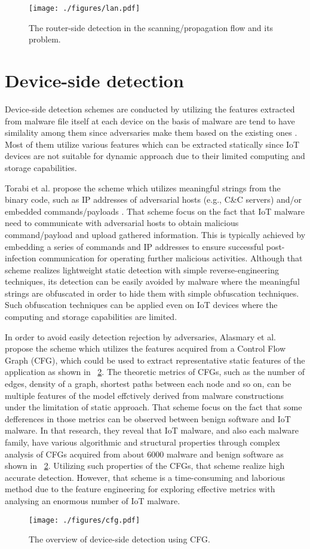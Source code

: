 \begin{figure}[h]
 \centering
 \texttt{[image: ./figures/lan.pdf]}
 \caption{The router-side detection in the scanning/propagation flow and its problem.} 
 \label{fig:lan}
\end{figure}

\section{Device-side detection} 
Device-side detection schemes are conducted by utilizing the features extracted from malware file itself at each device on the basis of malware are tend to have similality among them since adversaries make them based on the existing ones \cite{om, cfg}.
Most of them utilize various features which can be extracted statically since IoT devices are not suitable for dynamic approach due to their limited computing and storage capabilities.

Torabi et al. propose the scheme which utilizes meaningful strings from the binary code, such as IP addresses of adversarial hosts (e.g., C\&C servers) and/or embedded commands/payloads \cite{om}.
That scheme focus on the fact that IoT malware need to communicate with adversarial hosts to obtain malicious command/payload and upload gathered information.
This is typically achieved by embedding a series of commands and IP addresses to ensure successful post-infection communication for operating further malicious activities. 
Although that scheme realizes lightweight static detection with simple reverse-engineering techniques, its detection can be easily avoided by malware where the meaningful strings are obfuscated in order to hide them with simple obfuscation techniques.
Such obfuscation techniques can be applied even on IoT devices where the computing and storage capabilities are limited.

In order to avoid easily detection rejection by adversaries, Alasmary et al. \cite{cfg} propose the scheme which utilizes the features acquired from a Control Flow Graph (CFG), which could be used to extract representative static features of the application as shown in \figurename~\ref{fig:cfg}.
The theoretic metrics of CFGs, such as the number of edges, density of a graph, shortest paths between each node and so on, can be multiple features of the model effctively derived from malware constructions under the limitation of static approach.
That scheme focus on the fact that some defferences in those metrics can be observed between benign software and IoT malware.
In that research, they reveal that IoT malware, and also each malware family, have various algorithmic and structural properties through complex analysis of CFGs acquired from about 6000 malware and benign software as shown in \figurename~\ref{fig:cfg}. 
Utilizing such properties of the CFGs, that scheme realize high accurate detection.
However, that scheme is a time-consuming and laborious method due to the feature engineering for exploring effective metrics with analysing an enormous number of IoT malware.

\begin{figure}[h]
 \centering
 \texttt{[image: ./figures/cfg.pdf]}
 \caption{The overview of device-side detection using CFG.} 
 \label{fig:cfg}
\end{figure}
\afterpage{\clearpage}
\newpage
\newpage

